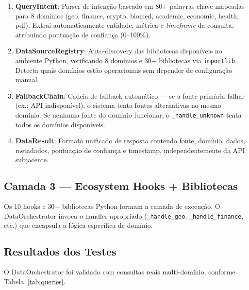 \documentclass[12pt,a4paper]{article}
\begin{document}
\begin{enumerate}
  \item \textbf{QueryIntent}: Parser de intenção baseado em 80+ palavras-chave mapeadas para 8 domínios (geo, finance, crypto, biomed, academic, economic, health, pdf). Extrai automaticamente entidade, métrica e \textit{timeframe} da consulta, atribuindo pontuação de confiança (0--100\%).

  \item \textbf{DataSourceRegistry}: Auto-discovery das bibliotecas disponíveis no ambiente Python, verificando 8 domínios e 30+ bibliotecas via \texttt{importlib}. Detecta quais domínios estão operacionais sem depender de configuração manual.

  \item \textbf{FallbackChain}: Cadeia de fallback automático — se a fonte primária falhar (ex.: API indisponível), o sistema tenta fontes alternativas no mesmo domínio. Se nenhuma fonte do domínio funcionar, o \texttt{\_handle\_unknown} tenta todos os domínios disponíveis.

  \item \textbf{DataResult}: Formato unificado de resposta contendo fonte, domínio, dados, metadados, pontuação de confiança e timestamp, independentemente da API subjacente.
\end{enumerate}

\subsection{Camada 3 — Ecosystem Hooks + Bibliotecas}

Os 10 hooks e 30+ bibliotecas Python formam a camada de execução. O DataOrchestrator invoca o handler apropriado (\texttt{\_handle\_geo}, \texttt{\_handle\_finance}, etc.) que encapsula a lógica específica de domínio.

\subsection{Resultados dos Testes}

O DataOrchestrator foi validado com consultas reais multi-domínio, conforme Tabela~\ref{tab:queries}.
\end{document}
